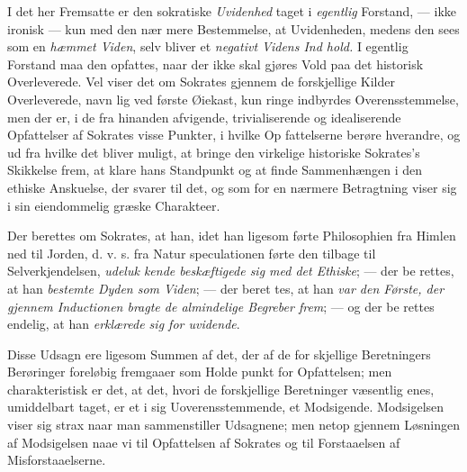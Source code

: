 I det her Fremsatte er den sokratiske \emph{Uvidenhed} taget
i \emph{egentlig} Forstand, --- ikke ironisk --- kun med den nær\-%
mere Bestemmelse, at Uvidenheden, medens den sees som en
\emph{hæmmet Viden}, selv bliver et \emph{negativt Videns Ind\-%
hold.} I egentlig Forstand maa den opfattes, naar der ikke
skal gjøres Vold paa det historisk Overleverede. Vel viser det
om Sokrates gjennem de forskjellige Kilder Overleverede, navn\-%
lig ved første Øiekast, kun ringe indbyrdes Overensstemmelse,
men der er, i de fra hinanden afvigende, trivialiserende og
idealiserende Opfattelser af Sokrates visse Punkter, i hvilke Op\-%
fattelserne berøre hverandre, og ud fra hvilke det bliver muligt,
at bringe den virkelige historiske Sokrates's Skikkelse frem, at
klare hans Standpunkt og at finde Sammenhængen i den
ethiske Anskuelse, der svarer til det, og som for en nærmere
Betragtning viser sig i sin eiendommelig græske Charakteer.

Der berettes om Sokrates, at han, idet han ligesom førte
Philosophien fra Himlen ned til Jorden, d. v. s. fra Natur\-%
speculationen førte den tilbage til Selverkjendelsen, \emph{udeluk\-%
kende beskæftigede sig med det Ethiske}; --- der be\-%
rettes, at han \emph{bestemte Dyden som Viden}; --- der beret\-%
tes, at han \emph{var den Første, der gjennem Inductionen
bragte de almindelige Begreber frem}; --- og der be\-%
rettes endelig, at han \emph{erklærede sig for uvidende}.

Disse Udsagn ere ligesom Summen af det, der af de for\-%
skjellige Beretningers Berøringer foreløbig fremgaaer som Holde\-%
punkt for Opfattelsen; men charakteristisk er det, at det, hvori
de forskjellige Beretninger væsentlig enes, umiddelbart taget,
er et i sig Uoverensstemmende, et Modsigende. Modsigelsen
viser sig strax naar man sammenstiller Udsagnene; men netop
gjennem Løsningen af Modsigelsen naae vi til Opfattelsen af
Sokrates og til Forstaaelsen af Misforstaaelserne.

